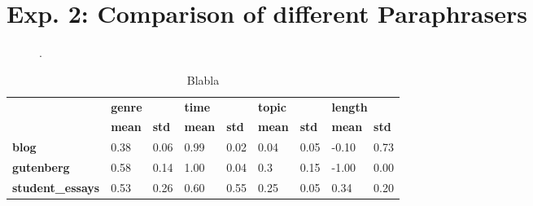 \section{Exp. 2: Comparison of different Paraphrasers}

\begin{figure}[htbp]
    \centering
    
    \caption{.}
    \label{fig:extraction_eval}
\end{figure}

\begin{table}[]
\centering
\caption{Blabla}
\label{tab:extraction_eval_stats}
\begin{tabular}{lllllllll}
\toprule
 &
  \multicolumn{2}{l}{\textbf{genre}} &
  \multicolumn{2}{l}{\textbf{time}} &
  \multicolumn{2}{l}{\textbf{topic}} &
  \multicolumn{2}{l}{\textbf{length}} \\
 &
  \textbf{mean} &
  \textbf{std} &
  \textbf{mean} &
  \textbf{std} &
  \textbf{mean} &
  \textbf{std} &
  \textbf{mean} &
  \textbf{std} \\
  \midrule
\textbf{blog}            & 0.38 & 0.06  & 0.99 & 0.02 & 0.04  & 0.05  & -0.10 & 0.73 \\
\textbf{gutenberg}       & 0.58 & 0.14  & 1.00 & 0.04 & 0.3 & 0.15 & -1.00 & 0.00  \\
\textbf{student\_essays} & 0.53 & 0.26 & 0.60 & 0.55 & 0.25 & 0.05  & 0.34 & 0.20 \\
  \bottomrule
\end{tabular}%
\end{table}